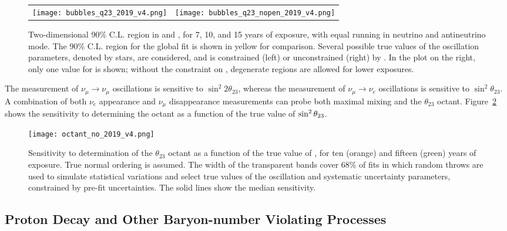 \begin{figure}[h!]
    \centering
    \begin{tabular}{cc}
		\texttt{[image: bubbles\_q23\_2019\_v4.png]} &
		\texttt{[image: bubbles\_q23\_nopen\_2019\_v4.png]} 
	\end{tabular}  
	\caption[Two-dimensional 90\% C.L. region in  and \deltacp]{Two-dimensional 90\% C.L. region in  and \deltacp, for 7, 10, and 15 years of exposure, with equal running in neutrino and antineutrino mode. The 90\% C.L. region for the  global fit is shown in yellow for comparison. Several possible true values of the oscillation parameters, denoted by stars, are considered, and  is constrained (left) or unconstrained (right) by . In the plot on the right, only one value for  is shown; without the constraint on , degenerate regions are allowed for lower exposures.}
    \label{fig:res_th23vdcp_degen}
\end{figure}

The measurement of $\nu_\mu \rightarrow \nu_\mu$ oscillations is sensitive to $\sin ^2 2 \theta_{23}$, whereas the measurement of $\nu_\mu \rightarrow \nu_e$ oscillations is sensitive to $\sin^2 \theta_{23}$.  A combination of both $\nu_e$ appearance and $\nu_\mu$ disappearance measurements can probe both maximal mixing and
the $\theta_{23}$ octant.  
Figure~\ref{fig:lbloctant} shows the sensitivity to determining the octant as a function of the true value of $\sin^2\theta_{23}$.

\begin{figure}[h!]
    \centering
		\texttt{[image: octant\_no\_2019\_v4.png]}
	\caption[Sensitivity of determination of the $\theta_{23}$ octant as a function of ]{Sensitivity to determination of the $\theta_{23}$ octant as a function of the true value of , for ten (orange) and fifteen (green) years of exposure. True normal ordering is assumed. The width of the transparent bands cover 68\% of fits in which random throws are used to simulate statistical variations and select true values of the oscillation and systematic uncertainty parameters, constrained by pre-fit uncertainties. The solid lines show the median sensitivity.}
    \label{fig:lbloctant}
\end{figure}

\clearpage
\subsection{Proton Decay and Other 
Baryon-number Violating Processes}

